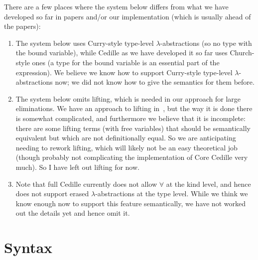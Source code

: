\documentclass{article}
\begin{document}
There are a few places where the system below differs from what we
have developed so far in papers and/or our implementation (which is
usually ahead of the papers):

\begin{enumerate}
  \item The system below uses Curry-style type-level
    $\lambda$-abstractions (so no type with the bound variable), while
    Cedille as we have developed it so far uses Church-style ones (a
    type for the bound variable is an essential part of the
    expression).  We believe we know how to support Curry-style
    type-level $\lambda$-abstractions now; we did not know how to
    give the semantics for them before.  

  \item The system below omits lifting, which is needed in our
    approach for large eliminations.  We have an approach to lifting
    in~\cite{stump17a}, but the way it is done there is somewhat
    complicated, and furthermore we believe that it is incomplete: there
    are some lifting terms (with free variables) that should be semantically
    equivalent but which are not definitionally equal.  So we are
    anticipating needing to rework lifting, which will likely not be
    an easy theoretical job (though probably not complicating the implementation
    of Core Cedille very much).  So I have left out lifting for now.

  \item Note that full Cedille currently does not allow $\forall$ at the kind level,
    and hence does not support erased $\lambda$-abstractions at the type level.  While
    we think we know enough now to support this feature semantically, we have not
    worked out the details yet and hence omit it.

    \end{enumerate}

\section{Syntax}
\label{sec:syntax}
\end{document}
